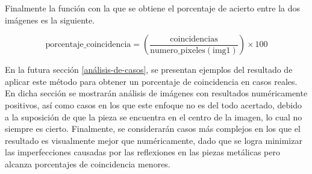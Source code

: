 Finalmente la función con la que se obtiene el porcentaje de acierto entre la dos imágenes es la siguiente.

$$\text{porcentaje\_coincidencia} = \left( \frac{\text{coincidencias}}{\text{numero\_pixeles}(\text{img1})} \right) \times 100$$

En la futura sección \ref{análisis-de-casos}, se presentan ejemplos del resultado de aplicar este método para obtener un porcentaje de coincidencia en casos reales. En dicha sección se mostrarán análisis de imágenes con resultados numéricamente positivos, así como casos en los que este enfoque no es del todo acertado, debido a la suposición de que la pieza se encuentra en el centro de la imagen, lo cual no siempre es cierto. Finalmente, se considerarán casos más complejos en los que el resultado es visualmente mejor que numéricamente, dado que se logra minimizar las imperfecciones causadas por las reflexiones en las piezas metálicas pero alcanza porcentajes de coincidencia menores.
